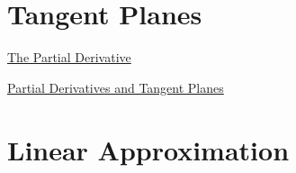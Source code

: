 \documentclass{ximera}
\begin{document}
\section{Tangent Planes}
\begin{exploration}  \label{Edf754665}

 
\begin{onlineOnly}
    \begin{center}
\end{center}
\end{onlineOnly}


\href{https://www.desmos.com/calculator/y0h5kuvmbt}{The Partial Derivative}

\end{exploration}




\begin{exploration}  \label{Ede5fhj4665}
\href{https://www.geogebra.org/m/Hud6Hnpk}{Partial Derivatives and Tangent Planes}
\end{exploration}


\section{Linear Approximation}
\end{document}
